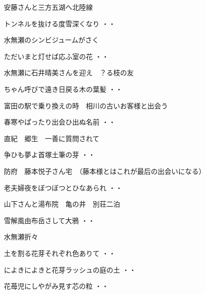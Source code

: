 \vspace{0.6cm}
安藤さんと三方五湖へ北陸線
\begin{shiika}トンネルを抜ける度雪深くなり
\hfill{・・}\end{shiika}
\vspace{0.6cm}
水無瀬のシンビジュームがさく
\begin{shiika}ただいまと灯せば応ふ室の花
\hfill{・・}\end{shiika}
\vspace{0.6cm}
水無瀬に石井晴美さんを迎え　？る枝の友
\begin{shiika}ちゃん呼びで遠き日戻る木の葉髪
\hfill{・・}\end{shiika}
\vspace{0.6cm}
富田の駅で乗り換えの時　相川の古いお客様と出会う
\begin{shiika}春寒やぱったり出会ひ出ぬ名前
\hfill{・・}\end{shiika}
\vspace{0.6cm}
直紀　郷生　一善に質問されて
\begin{shiika}争ひも夢よ首塚土筆の芽
\hfill{・・}\end{shiika}
\vspace{0.6cm}
防府　藤本悦子さん宅　（藤本様とはこれが最后の出会いになる）
\begin{shiika}老夫婦夜をぼつぼつとひなあられ
\hfill{・・}\end{shiika}
\vspace{0.6cm}
山下さんと湯布院　亀の井　別荘二泊
\begin{shiika}雪解風由布岳さして大鴉
\hfill{・・}\end{shiika}
\vspace{0.6cm}
水無瀬折々
\begin{shiika}土を割る花芽それぞれ色ありて
\hfill{・・}\end{shiika}
\begin{shiika}によきによきと花芽ラッシュの庭の土
\hfill{・・}\end{shiika}
\begin{shiika}花苺児にしやがみ見す芯の粒
\hfill{・・}\end{shiika}
